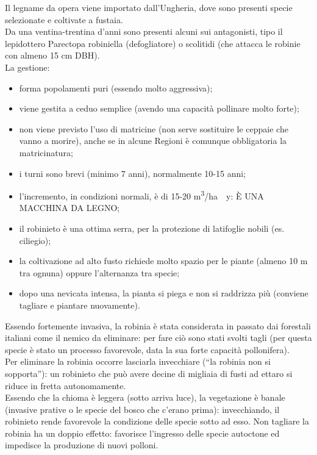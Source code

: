 Il legname da opera viene importato dall'Ungheria, dove sono presenti specie selezionate e coltivate a fustaia.\\
Da una ventina-trentina d'anni sono presenti alcuni sui antagonisti, tipo il lepidottero Parectopa robiniella (defogliatore) o scolitidi (che attacca le robinie con almeno 15 cm DBH).\\
La gestione:
\begin{itemize}[nosep]
    \item forma popolamenti puri (essendo molto aggressiva);
    \item viene gestita a ceduo semplice (avendo una capacità pollinare molto forte);
    \item non viene previsto l'uso di matricine (non serve sostituire le ceppaie che vanno a morire), anche se in alcune Regioni è comunque obbligatoria la matricinatura;
    \item i turni sono brevi (minimo 7 anni), normalmente 10-15 anni;
    \item l'incremento, in condizioni normali, è di 15-20 \unit{m^3/ha \cdot y}: È UNA MACCHINA DA LEGNO;
    \item il robinieto è una ottima serra, per la protezione di latifoglie nobili (es. ciliegio);
    \item la coltivazione ad alto fusto richiede molto spazio per le piante (almeno 10 m tra ognuna) oppure l'alternanza tra specie;
    \item dopo una nevicata intensa, la pianta si piega e non si raddrizza più (conviene tagliare e piantare nuovamente).
\end{itemize}
Essendo fortemente invasiva, la robinia è stata considerata in passato dai forestali italiani come il nemico da eliminare: per fare ciò sono stati svolti tagli (per questa specie è stato un processo favorevole, data la sua forte capacità pollonifera).\\
Per eliminare la robinia occorre lasciarla invecchiare (``la robinia non si sopporta''): un robinieto che può avere decine di migliaia di fusti ad ettaro si riduce in fretta autonomamente.\\
Essendo che la chioma è leggera (sotto arriva luce), la vegetazione è banale (invasive prative o le specie del bosco che c'erano prima): invecchiando, il robinieto rende favorevole la condizione delle specie sotto ad esso. Non tagliare la robinia ha un doppio effetto: favorisce l'ingresso delle specie autoctone ed impedisce la produzione di nuovi polloni.\\
